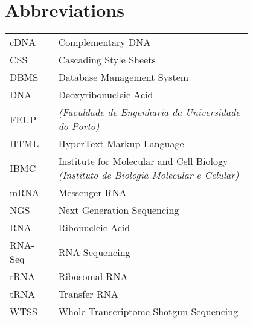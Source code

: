 \chapter*{Abbreviations}

\begin{flushleft}
\begin{tabular}{l p{0.8\linewidth}}
cDNA      & Complementary DNA\\
CSS       & Cascading Style Sheets\\
DBMS      & Database Management System\\
DNA       & Deoxyribonucleic Acid\\
FEUP      & \Feup{} \textit{(Faculdade de Engenharia da Universidade do Porto)}\\
HTML      & HyperText Markup Language\\
IBMC      & Institute for Molecular and Cell Biology \textit{(Instituto de Biologia Molecular e Celular)}\\
mRNA      & Messenger RNA\\
NGS       & Next Generation Sequencing\\
RNA       & Ribonucleic Acid\\
RNA-Seq   & RNA Sequencing\\
rRNA      & Ribosomal RNA\\
tRNA      & Transfer RNA\\
WTSS      & Whole Transcriptome Shotgun Sequencing\\
\end{tabular}
\end{flushleft}

